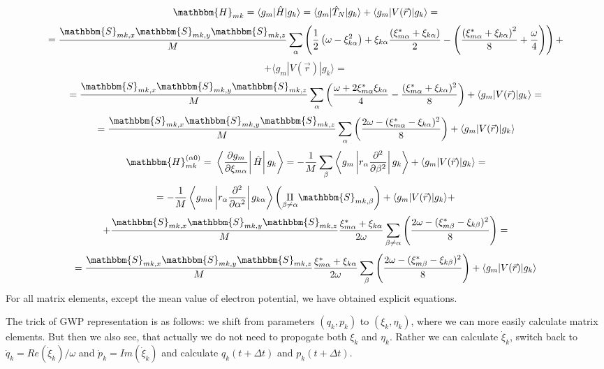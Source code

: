 $$\mathbbm{H}_{mk}=\langle g_m|\hat{H}|g_k\rangle=\langle g_m|\hat{T}_N|g_k\rangle+\langle g_m|V(\vec{r})|g_k\rangle=$$
$$=\frac{\mathbbm{S}_{mk,x}\mathbbm{S}_{mk,y}\mathbbm{S}_{mk,z}}{M}%
		       \sum_{\alpha}\left( \frac{1}{2}\left(\omega-\xi_{k\alpha}^2\right)+%
		       \xi_{k\alpha}\frac{\left(\xi_{m\alpha}^*+\xi_{k\alpha}\right)}{2}-%
		       \left(\frac{\left(\xi_{m\alpha}^*+\xi_{k\alpha}\right)^2}{8}+\frac{\omega}{4}\right)\right)+$$
$$+\langle g_m|V(\vec{r})|g_k\rangle=$$
$$=\frac{\mathbbm{S}_{mk,x}\mathbbm{S}_{mk,y}\mathbbm{S}_{mk,z}}{M}%
   \sum_{\alpha}\left(\frac{\omega+2\xi_{m\alpha}^*\xi_{k\alpha}}{4}-\frac{(\xi_{m\alpha}^*+\xi_{k\alpha})^2}{8} \right)+\langle g_m|V(\vec{r})|g_k\rangle=$$
$$=\frac{\mathbbm{S}_{mk,x}\mathbbm{S}_{mk,y}\mathbbm{S}_{mk,z}}{M}%
   \sum_{\alpha}\left(\frac{2\omega-(\xi_{m\alpha}^*-\xi_{k\alpha})^2}{8} \right)+\langle g_m|V(\vec{r})|g_k\rangle$$
$$\mathbbm{H}_{mk}^{(\alpha0)}=\left.\left.\left\langle\frac{\partial g_m}{\partial\xi_{m\alpha}}\right|\hat{H}\right|g_k\right\rangle=%
  -\frac{1}{M}\sum_{\beta}\left\langle g_m\left|r_{\alpha}\frac{\partial^2}{\partial\beta^2}\right|g_k\right\rangle+\langle g_m|V(\vec{r})|g_k\rangle=$$
$$=-\frac{1}{M}\left\langle g_{m\alpha}\left|r_{\alpha}\frac{\partial^2}{\partial\alpha^2}\right|g_{k\alpha}\right\rangle\left(\underset{\beta\neq\alpha}{\Pi}\mathbbm{S}_{mk,\beta}\right)+%
   \langle g_m|V(\vec{r})|g_k\rangle+$$
$$ +\frac{\mathbbm{S}_{mk,x}\mathbbm{S}_{mk,y}\mathbbm{S}_{mk,z}}{M}\frac{\xi_{m\alpha}^*+\xi_{k\alpha}}{2\omega}%
    \sum_{\beta\neq\alpha}\left(\frac{2\omega-(\xi_{m\beta}^*-\xi_{k\beta})^2}{8}\right)=$$
$$=\frac{\mathbbm{S}_{mk,x}\mathbbm{S}_{mk,y}\mathbbm{S}_{mk,z}}{M}\frac{\xi_{m\alpha}^*+\xi_{k\alpha}}{2\omega}%
    \sum_{\beta}\left(\frac{2\omega-(\xi_{m\beta}^*-\xi_{k\beta})^2}{8}\right)+\langle g_m|V(\vec{r})|g_k\rangle$$
For all matrix elements, except the mean value of electron potential, we have obtained explicit equations.

The trick of GWP representation is as follows: we shift from parameters $(q_k,p_k)$ to $(\xi_k,\eta_k)$, 
where we can more easily calculate matrix elements.
But then we also see, that actually we do not need to propogate both $\xi_k$ and $\eta_k$.
Rather we can calculate $\dot{\xi}_k$, switch back to $\dot{q}_k=\mathit{Re}(\dot{\xi}_k)/\omega$ 
and $\dot{p}_k=\mathit{Im}(\dot{\xi}_k)$ and calculate $q_k(t+\Delta t)$ and $p_k(t+\Delta t)$.


